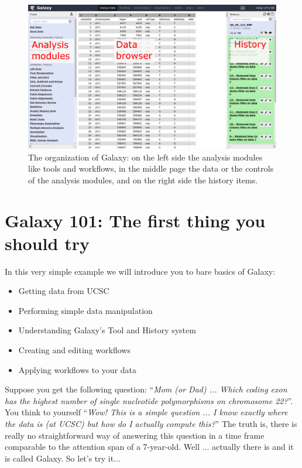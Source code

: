 \documentclass[11pt,a4paper]{article}
\begin{document}
\begin{figure}
 \center
  \includegraphics[width=\textwidth]{figures/galaxy_layout}
  \caption{\small{ The organization of Galaxy: on the left side the analysis modules like tools and workflows, in the middle page the data or the controls of the analysis modules, and on the right side the history items. }}
  \label{fig:organization_layout}
\end{figure}

\section*{Galaxy 101: The first thing you should try}
In this very simple example we will introduce you to bare basics of Galaxy:
\begin{itemize}
	\item Getting data from UCSC
	\item Performing simple data manipulation
	\item Understanding Galaxy's Tool and History system
	\item Creating and editing workflows
	\item Applying workflows to your data
\end{itemize}
Suppose you get the following question: ``\textit{Mom (or Dad) ... Which coding exon has the highest number of single nucleotide polymorphisms on chromosome 22?}''. You think to yourself ``\textit{Wow! This is a simple question ... I know exactly where the data is (at UCSC) but how do I actually compute this?}'' The truth is, there is really no
straightforward way of answering this question in a time frame comparable to the attention span of a 7-year-old. Well ... actually there is and it is called Galaxy. So let's try it...
\end{document}

